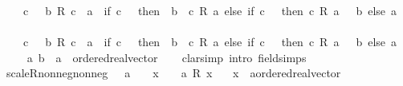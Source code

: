 \begin{isabellebody}
\ \ {\isachardoublequoteopen}{}\ {\isacharless}{\kern0pt}\ c\ {\isasymLongrightarrow}\ {\isacharminus}{\kern0pt}\ {\isacharparenleft}{\kern0pt}b\ {\isacharslash}{\kern0pt}\isactrlsub R\ c{\isacharparenright}{\kern0pt}\ {\isasymle}\ a\ {\isasymlongleftrightarrow}\ {\isacharparenleft}{\kern0pt}if\ c\ {\isachargreater}{\kern0pt}\ {}\ then\ {\isacharminus}{\kern0pt}\ b\ {\isasymle}\ c\ {\isacharasterisk}{\kern0pt}\isactrlsub R\ a\ else\ if\ c\ {\isacharless}{\kern0pt}\ {}\ then\ c\ {\isacharasterisk}{\kern0pt}\isactrlsub R\ a\ {\isasymle}\ {\isacharminus}{\kern0pt}\ b\ else\ a\ {\isasymge}\ {}{\isacharparenright}{\kern0pt}{\isachardoublequoteclose}\isanewline
\ \ {\isachardoublequoteopen}{}\ {\isacharless}{\kern0pt}\ c\ {\isasymLongrightarrow}\ {\isacharminus}{\kern0pt}\ {\isacharparenleft}{\kern0pt}b\ {\isacharslash}{\kern0pt}\isactrlsub R\ c{\isacharparenright}{\kern0pt}\ {\isacharless}{\kern0pt}\ a\ {\isasymlongleftrightarrow}\ {\isacharparenleft}{\kern0pt}if\ c\ {\isachargreater}{\kern0pt}\ {}\ then\ {\isacharminus}{\kern0pt}\ b\ {\isacharless}{\kern0pt}\ c\ {\isacharasterisk}{\kern0pt}\isactrlsub R\ a\ else\ if\ c\ {\isacharless}{\kern0pt}\ {}\ then\ c\ {\isacharasterisk}{\kern0pt}\isactrlsub R\ a\ {\isacharless}{\kern0pt}\ {\isacharminus}{\kern0pt}\ b\ else\ a\ {\isachargreater}{\kern0pt}\ {}{\isacharparenright}{\kern0pt}{\isachardoublequoteclose}\isanewline
\ \ \ a\ b\ {\isacharcolon}{\kern0pt}{\isacharcolon}{\kern0pt}\ {\isachardoublequoteopen}{\isacharprime}{\kern0pt}a\ {\isacharcolon}{\kern0pt}{\isacharcolon}{\kern0pt}\ ordered{\isacharunderscore}{\kern0pt}real{\isacharunderscore}{\kern0pt}vector{\isachardoublequoteclose}\isanewline
%
\isadelimproof
\ \ %
\endisadelimproof
%
\isatagproof
{}\isamarkupfalse%
\ {\isacharparenleft}{\kern0pt}clarsimp\ intro{\isacharbang}{\kern0pt}{\isacharcolon}{\kern0pt}\ field{\isacharunderscore}{\kern0pt}simps{\isacharparenright}{\kern0pt}{\isacharplus}{\kern0pt}%
\endisatagproof
{\isafoldproof}%
%
\isadelimproof
\isanewline
%
\endisadelimproof
\isanewline
{}\isamarkupfalse%
\ scaleR{\isacharunderscore}{\kern0pt}nonneg{\isacharunderscore}{\kern0pt}nonneg{\isacharcolon}{\kern0pt}\ {\isachardoublequoteopen}{}\ {\isasymle}\ a\ {\isasymLongrightarrow}\ {}\ {\isasymle}\ x\ {\isasymLongrightarrow}\ {}\ {\isasymle}\ a\ {\isacharasterisk}{\kern0pt}\isactrlsub R\ x{\isachardoublequoteclose}\isanewline
\ \ \ x\ {\isacharcolon}{\kern0pt}{\isacharcolon}{\kern0pt}\ {\isachardoublequoteopen}{\isacharprime}{\kern0pt}a{\isacharcolon}{\kern0pt}{\isacharcolon}{\kern0pt}ordered{\isacharunderscore}{\kern0pt}real{\isacharunderscore}{\kern0pt}vector{\isachardoublequoteclose}\isanewline

\end{isabellebody}
